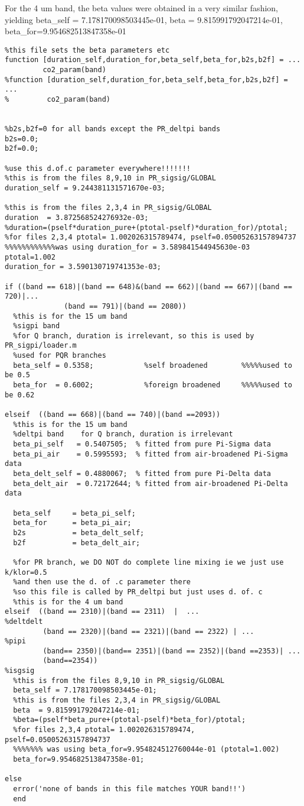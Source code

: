 \documentclass[11pt]{article}
\begin{document}
For the 4 um band, the beta values were obtained in a very similar fashion,
yielding beta\_self = 7.178170098503445e-01, beta  = 9.815991792047214e-01,
beta\_for=9.954682513847358e-01

\begin{verbatim}
%this file sets the beta parameters etc
function [duration_self,duration_for,beta_self,beta_for,b2s,b2f] = ...
         co2_param(band)
%function [duration_self,duration_for,beta_self,beta_for,b2s,b2f] = ...
%         co2_param(band)


%b2s,b2f=0 for all bands except the PR_deltpi bands
b2s=0.0;
b2f=0.0;

%use this d.of.c parameter everywhere!!!!!!!
%this is from the files 8,9,10 in PR_sigsig/GLOBAL
duration_self = 9.244381131571670e-03;

%this is from the files 2,3,4 in PR_sigsig/GLOBAL
duration  = 3.872568524276932e-03;
%duration=(pself*duration_pure+(ptotal-pself)*duration_for)/ptotal; 
%for files 2,3,4 ptotal= 1.002026315789474, pself=0.05005263157894737
%%%%%%%%%%%%was using duration_for = 3.589841544945630e-03  ptotal=1.002
duration_for = 3.590130719741353e-03;

if ((band == 618)|(band == 648)&(band == 662)|(band == 667)|(band == 720)|...
              (band == 791)|(band == 2080))
  %this is for the 15 um band
  %sigpi band   
  %for Q branch, duration is irrelevant, so this is used by PR_sigpi/loader.m
  %used for PQR branches
  beta_self = 0.5358;            %self broadened        %%%%%used to be 0.5
  beta_for  = 0.6002;            %foreign broadened     %%%%%used to be 0.62
  
elseif  ((band == 668)|(band == 740)|(band ==2093))
  %this is for the 15 um band
  %deltpi band    for Q branch, duration is irrelevant
  beta_pi_self   = 0.5407505;  % fitted from pure Pi-Sigma data 
  beta_pi_air    = 0.5995593;  % fitted from air-broadened Pi-Sigma data 
  beta_delt_self = 0.4880067;  % fitted from pure Pi-Delta data 
  beta_delt_air  = 0.72172644; % fitted from air-broadened Pi-Delta data 

  beta_self     = beta_pi_self;
  beta_for      = beta_pi_air;
  b2s           = beta_delt_self;
  b2f           = beta_delt_air;

  %for PR branch, we DO NOT do complete line mixing ie we just use k/klor=0.5
  %and then use the d. of .c parameter there
  %so this file is called by PR_deltpi but just uses d. of. c
  %this is for the 4 um band
elseif  ((band == 2310)|(band == 2311)  |  ...                      %deltdelt
         (band == 2320)|(band == 2321)|(band == 2322) | ...         %pipi
         (band== 2350)|(band== 2351)|(band == 2352)|(band ==2353)| ...
         (band==2354))                                              %isgsig
  %this is from the files 8,9,10 in PR_sigsig/GLOBAL
  beta_self = 7.178170098503445e-01; 
  %this is from the files 2,3,4 in PR_sigsig/GLOBAL
  beta  = 9.815991792047214e-01; 
  %beta=(pself*beta_pure+(ptotal-pself)*beta_for)/ptotal; 
  %for files 2,3,4 ptotal= 1.002026315789474, pself=0.05005263157894737
  %%%%%%% was using beta_for=9.954824512760044e-01 (ptotal=1.002)
  beta_for=9.954682513847358e-01;

else
  error('none of bands in this file matches YOUR band!!')
  end


\end{verbatim}
\end{document}
